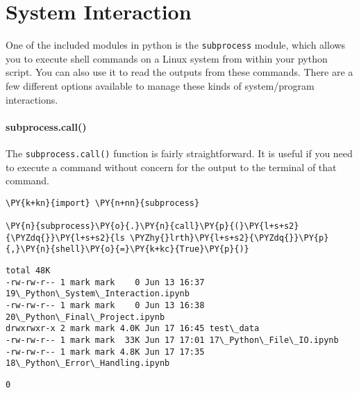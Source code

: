 \section{System Interaction}
One of the included modules in python is the \texttt{subprocess} module,
which allows you to execute shell commands on a Linux system from within
your python script. You can also use it to read the outputs from these
commands. There are a few different options available to manage these
kinds of system/program interactions.

\hypertarget{subprocess.call}{%
\paragraph{subprocess.call()}\label{subprocess.call}}

The \texttt{subprocess.call()} function is fairly straightforward. It is
useful if you need to execute a command without concern for the output
to the terminal of that command.

    \begin{tcolorbox}[breakable, size=fbox, boxrule=1pt, pad at break*=1mm,colback=cellbackground, colframe=cellborder]
\begin{Verbatim}[commandchars=\\\{\}]
\PY{k+kn}{import} \PY{n+nn}{subprocess}

\PY{n}{subprocess}\PY{o}{.}\PY{n}{call}\PY{p}{(}\PY{l+s+s2}{\PYZdq{}}\PY{l+s+s2}{ls \PYZhy{}lrth}\PY{l+s+s2}{\PYZdq{}}\PY{p}{,}\PY{n}{shell}\PY{o}{=}\PY{k+kc}{True}\PY{p}{)}
\end{Verbatim}
\end{tcolorbox}

    \begin{Verbatim}[commandchars=\\\{\}]
total 48K
-rw-rw-r-- 1 mark mark    0 Jun 13 16:37 19\_Python\_System\_Interaction.ipynb
-rw-rw-r-- 1 mark mark    0 Jun 13 16:38 20\_Python\_Final\_Project.ipynb
drwxrwxr-x 2 mark mark 4.0K Jun 17 16:45 test\_data
-rw-rw-r-- 1 mark mark  33K Jun 17 17:01 17\_Python\_File\_IO.ipynb
-rw-rw-r-- 1 mark mark 4.8K Jun 17 17:35 18\_Python\_Error\_Handling.ipynb
    \end{Verbatim}

            \begin{tcolorbox}[breakable, size=fbox, boxrule=.5pt, pad at break*=1mm, opacityfill=0]
\begin{Verbatim}[commandchars=\\\{\}]
0
\end{Verbatim}
\end{tcolorbox}
        
